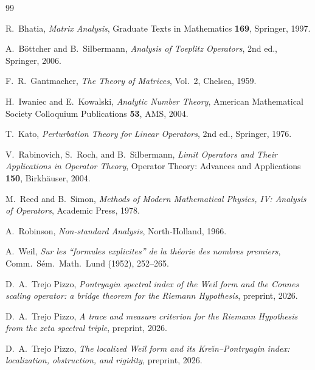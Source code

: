 \documentclass[11pt,reqno]{amsart}
\theoremstyle{definition}
\begin{document}
\begin{thebibliography}{99}

R.~Bhatia,
\emph{Matrix Analysis},
Graduate Texts in Mathematics \textbf{169}, Springer, 1997.

A.~B\"ottcher and B.~Silbermann,
\emph{Analysis of Toeplitz Operators},
2nd ed., Springer, 2006.

F.~R.~Gantmacher,
\emph{The Theory of Matrices}, Vol.~2,
Chelsea, 1959.

H.~Iwaniec and E.~Kowalski,
\emph{Analytic Number Theory},
American Mathematical Society Colloquium Publications \textbf{53}, AMS, 2004.

T.~Kato,
\emph{Perturbation Theory for Linear Operators},
2nd ed., Springer, 1976.

V.~Rabinovich, S.~Roch, and B.~Silbermann,
\emph{Limit Operators and Their Applications in Operator Theory},
Operator Theory: Advances and Applications \textbf{150}, Birkh\"auser, 2004.

M.~Reed and B.~Simon,
\emph{Methods of Modern Mathematical Physics, IV: Analysis of Operators},
Academic Press, 1978.

A.~Robinson,
\emph{Non-standard Analysis},
North-Holland, 1966.

A.~Weil,
\emph{Sur les ``formules explicites'' de la th\'eorie des nombres premiers},
Comm.\ S\'em.\ Math.\ Lund (1952), 252--265.

 D.~A.~Trejo Pizzo, \emph{Pontryagin spectral index of the Weil form and the Connes scaling operator: a bridge theorem for the Riemann Hypothesis}, preprint, 2026.

 D.~A.~Trejo Pizzo, \emph{A trace and measure criterion for the Riemann Hypothesis from the zeta spectral triple}, preprint, 2026.

 D.~A.~Trejo Pizzo, \emph{The localized Weil form and its Kre\u\i n--Pontryagin index: localization, obstruction, and rigidity}, preprint, 2026.

\end{thebibliography}
\end{document}
